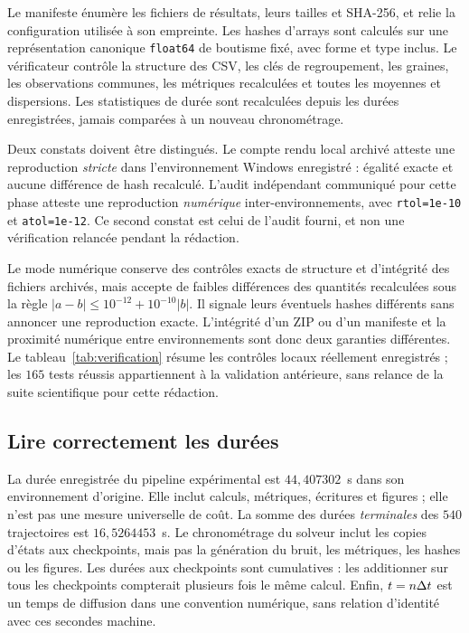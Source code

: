 Le manifeste énumère les fichiers de résultats, leurs tailles et SHA-256,
et relie la configuration utilisée à son empreinte. Les hashes d'arrays
sont calculés sur une représentation canonique \texttt{float64} de
boutisme fixé, avec forme et type inclus. Le vérificateur contrôle la
structure des CSV, les clés de regroupement, les graines, les observations
communes, les métriques recalculées et toutes les moyennes et dispersions.
Les statistiques de durée sont recalculées depuis les durées enregistrées,
jamais comparées à un nouveau chronométrage.

Deux constats doivent être distingués. Le compte rendu local archivé
 atteste une reproduction
\emph{stricte} dans l'environnement Windows enregistré : égalité exacte
et aucune différence de hash recalculé. L'audit indépendant communiqué
pour cette phase atteste une reproduction \emph{numérique}
inter-environnements, avec \texttt{rtol=1e-10} et \texttt{atol=1e-12}.
Ce second constat est celui de l'audit fourni, et non une vérification
relancée pendant la rédaction.

Le mode numérique conserve des contrôles exacts de structure et
d'intégrité des fichiers archivés, mais accepte de faibles différences
des quantités recalculées sous la règle
$|a-b|\leq10^{-12}+10^{-10}|b|$. Il signale leurs éventuels hashes
différents sans annoncer une reproduction exacte. L'intégrité d'un
ZIP ou d'un manifeste et la proximité numérique entre environnements
sont donc deux garanties différentes. Le tableau~\ref{tab:verification}
résume les contrôles locaux réellement enregistrés ; les $165$ tests
réussis appartiennent à la validation antérieure, sans relance de la
suite scientifique pour cette rédaction.

\begin{table}[htbp]
 \centering
 \caption{Contrôles consignés dans la vérification stricte locale de
 phase~4 ; durée et horodatage ne sont pas assimilés à des quantités
 déterministes.}
 \label{tab:verification}
 
\end{table}

\subsection{Lire correctement les durées}

La durée enregistrée du pipeline expérimental est
$44{,}407302$~s dans son environnement d'origine. Elle inclut calculs,
métriques, écritures et figures ; elle n'est pas une mesure universelle
de coût. La somme des durées \emph{terminales} des $540$ trajectoires
est $16{,}5264453$~s. Le chronométrage du solveur inclut les copies
d'états aux checkpoints, mais pas la génération du bruit, les métriques,
les hashes ou les figures. Les durées aux checkpoints sont cumulatives :
les additionner sur tous les checkpoints compterait plusieurs fois le
même calcul. Enfin, $t=n\Delta t$ est un temps de diffusion dans une convention
numérique, sans relation d'identité avec ces secondes machine.
